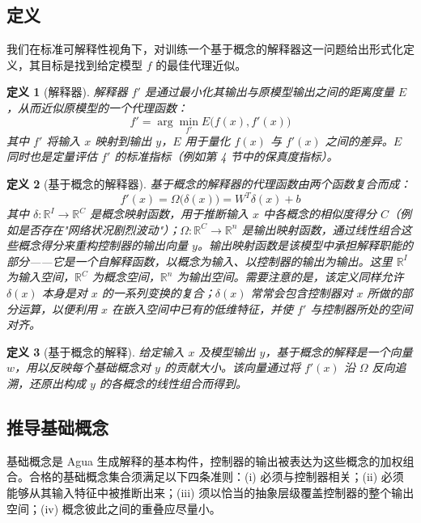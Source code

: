 \documentclass[11pt,a4paper]{article}
\newtheorem{definition}{定义}[section]
\begin{document}
\subsection{定义}

我们在标准可解释性视角下，对训练一个基于概念的解释器这一问题给出形式化定义，其目标是找到给定模型 $f$ 的最佳代理近似。

\begin{definition}[解释器]
解释器 $f'$ 是通过最小化其输出与原模型输出之间的距离度量 $E$，从而近似原模型的一个代理函数：
\[
f' = \arg\min_{f'} E\big(f(x), f'(x)\big)
\]
其中 $f'$ 将输入 $x$ 映射到输出 $y$，$E$ 用于量化 $f(x)$ 与 $f'(x)$ 之间的差异。$E$ 同时也是定量评估 $f'$ 的标准指标（例如第 4 节中的保真度指标）。
\end{definition}

\begin{definition}[基于概念的解释器]
基于概念的解释器的代理函数由两个函数复合而成：
\[
f'(x) = \Omega\big(\delta(x)\big) = W^{T}\delta(x) + b
\]
其中 $\delta: \mathbb{R}^{I}\to\mathbb{R}^{C}$ 是\emph{概念映射函数}，用于推断输入 $x$ 中各概念的相似度得分 $C$（例如是否存在"网络状况剧烈波动"）；$\Omega: \mathbb{R}^{C}\to\mathbb{R}^{n}$ 是\emph{输出映射函数}，通过线性组合这些概念得分来重构控制器的输出向量 $y$。输出映射函数是该模型中承担解释职能的部分——它是一个自解释函数，以概念为输入、以控制器的输出为输出。这里 $\mathbb{R}^{I}$ 为输入空间，$\mathbb{R}^{C}$ 为概念空间，$\mathbb{R}^{n}$ 为输出空间。需要注意的是，该定义同样允许 $\delta(x)$ 本身是对 $x$ 的一系列变换的复合；$\delta(x)$ 常常会包含控制器对 $x$ 所做的部分运算，以便利用 $x$ 在嵌入空间中已有的低维特征，并使 $f'$ 与控制器所处的空间对齐。
\end{definition}

\begin{definition}[基于概念的解释]
给定输入 $x$ 及模型输出 $y$，基于概念的解释是一个向量 $w$，用以反映每个基础概念对 $y$ 的贡献大小。该向量通过将 $f'(x)$ 沿 $\Omega$ 反向追溯，还原出构成 $y$ 的各概念的线性组合而得到。
\end{definition}

\subsection{推导基础概念}

基础概念是 Agua 生成解释的基本构件，控制器的输出被表达为这些概念的加权组合。合格的基础概念集合须满足以下四条准则：(i) 必须与控制器相关；(ii) 必须能够从其输入特征中被推断出来；(iii) 须以恰当的抽象层级覆盖控制器的整个输出空间；(iv) 概念彼此之间的重叠应尽量小。
\end{document}
